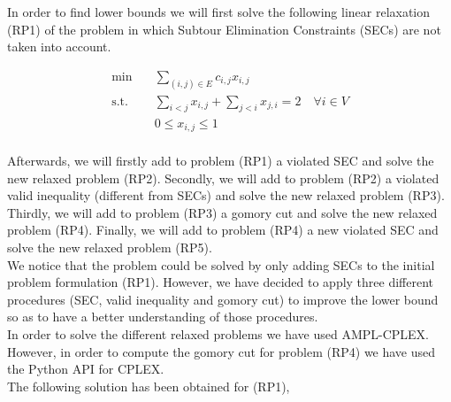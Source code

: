 \documentclass[12pt]{article}
\begin{document}
In order to find lower bounds we will first solve the following linear relaxation (RP1) of the problem in which Subtour Elimination Constraints (SECs) are not taken into account.

\begin{equation}
    \begin{aligned}
        \min \quad & \sum_{(i,j)\in E}c_{i,j}x_{i,j}\\
        \textrm{s.t.} \quad & \sum_{i<j}x_{i,j} + \sum_{j<i}x_{j,i} = 2 \quad \forall i \in V\\
        & 0 \leq x_{i,j}\leq 1    \\
    \end{aligned}
    \tag{RP1}\label{opt-P}
\end{equation}

Afterwards, we will firstly add to problem (RP1) a violated SEC and solve the new relaxed problem (RP2). Secondly, we will add to problem (RP2) a violated valid inequality (different from SECs) and solve the new relaxed problem (RP3). Thirdly, we will add to problem (RP3) a gomory cut and solve the new relaxed problem (RP4). Finally, we will add to problem (RP4) a new violated SEC and solve the new relaxed problem (RP5).\\

We notice that the problem could be solved by only adding SECs to the initial problem formulation (RP1). However, we have decided to apply three different procedures (SEC, valid inequality and gomory cut) to improve the lower bound so as to have a better understanding of those procedures.\\

In order to solve the different relaxed problems we have used AMPL-CPLEX. However, in order to compute the gomory cut for problem (RP4) we have used the Python API for CPLEX.\\  

The following solution has been obtained for (RP1),
\end{document}
